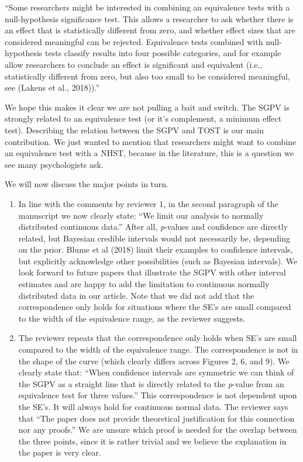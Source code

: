 \documentclass[man]{apa6}
\begin{document}
\enquote{Some researchers might be interested in combining an equivalence tests with a null-hypothesis significance test. This allows a researcher to ask whether there is an effect that is statistically different from zero, and whether effect sizes that are considered meaningful can be rejected. Equivalence tests combined with null-hypothesis tests classify results into four possible categories, and for example allow researchers to conclude an effect is significant and equivalent (i.e., statistically different from zero, but also too small to be considered meaningful, see (Lakens et al., 2018)).}

We hope this makes it clear we are not pulling a bait and switch. The SGPV is strongly related to an equivalence test (or it's complement, a minimum effect test). Describing the relation between the SGPV and TOST is our main contribution. We just wanted to mention that researchers might want to combine an equivalence test with a NHST, because in the literature, this is a question we see many psychologists ask.

We will now discuss the major points in turn.

\begin{enumerate}
\def\labelenumi{\arabic{enumi}.}
\item
  In line with the comments by reviewer 1, in the second paragraph of the manuscript we now clearly state: \enquote{We limit our analysis to normally distributed continuous data.} After all, \emph{p}-values and confidence are directly related, but Bayesian credible intervals would not necessarily be, depending on the prior. Blume et al (2018) limit their examples to confidence intervals, but explicitly acknowledge other possibilities (such as Bayesian intervals). We look forward to future papers that illustrate the SGPV with other interval estimates and are happy to add the limitation to continuous normally distributed data in our article. Note that we did not add that the correspondence only holds for situations where the SE's are small compared to the width of the equivalence range, as the reviewer suggests.
\item
  The reviewer repeats that the correspondence only holds when SE's are small compared to the width of the equivalence range. The correspondence is not in the shape of the curve (which clearly differs across Figures 2, 6, and 9). We clearly state that: \enquote{When confidence intervals are symmetric we can think of the SGPV as a straight line that is directly related to the \emph{p}-value from an equivalence test for three values.} This correspondence is not dependent upon the SE's. It will always hold for continuous normal data. The reviewer says that \enquote{The paper does not provide theoretical justification for this connection nor any proofs.} We are unsure which proof is needed for the overlap between the three points, since it is rather trivial and we believe the explanation in the paper is very clear.
\end{enumerate}
\end{document}
